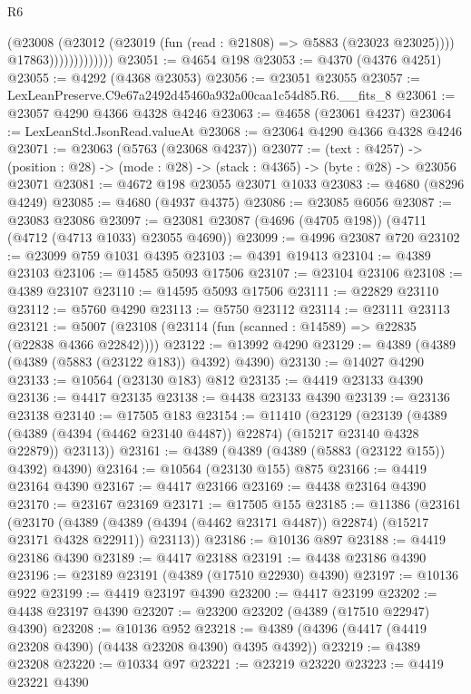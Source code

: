 \begin{lexlean}{R6}
\begin{coremodule}
                            (@23008
                              (@23012 (@23019 (fun (read : @21808) => @5883 (@23023 @23025))))
                              @17863)))))))))))))
@23051 := @4654 @198
@23053 := @4370 (@4376 @4251)
@23055 := @4292 (@4368 @23053)
@23056 := @23051 @23055
@23057 := LexLeanPreserve.C9e67a2492d45460a932a00caa1c54d85.R6.__fits_8
@23061 := @23057 @4290 @4366 @4328 @4246
@23063 := @4658 (@23061 @4237)
@23064 := LexLeanStd.JsonRead.valueAt
@23068 := @23064 @4290 @4366 @4328 @4246
@23071 := @23063 (@5763 (@23068 @4237))
@23077 := (text : @4257) ->
  (position : @28) -> (mode : @28) -> (stack : @4365) -> (byte : @28) -> @23056 @23071
@23081 := @4672 @198 @23055 @23071 @1033
@23083 := @4680 (@8296 @4249)
@23085 := @4680 (@4937 @4375)
@23086 := @23085 @6056
@23087 := @23083 @23086
@23097 := @23081 @23087 (@4696 (@4705 @198)) (@4711 (@4712 (@4713 @1033) @23055 @4690))
@23099 := @4996 @23087 @720
@23102 := @23099 @759 @1031 @4395
@23103 := @4391 @19413
@23104 := @4389 @23103
@23106 := @14585 @5093 @17506
@23107 := @23104 @23106
@23108 := @4389 @23107
@23110 := @14595 @5093 @17506
@23111 := @22829 @23110
@23112 := @5760 @4290
@23113 := @5750 @23112
@23114 := @23111 @23113
@23121 := @5007 (@23108 (@23114 (fun (scanned : @14589) => @22835 (@22838 @4366 @22842))))
@23122 := @13992 @4290
@23129 := @4389 (@4389 (@4389 (@5883 (@23122 @183)) @4392) @4390)
@23130 := @14027 @4290
@23133 := @10564 (@23130 @183) @812
@23135 := @4419 @23133 @4390
@23136 := @4417 @23135
@23138 := @4438 @23133 @4390
@23139 := @23136 @23138
@23140 := @17505 @183
@23154 := @11410
    (@23129
      (@23139
        (@4389 (@4389 (@4394 (@4462 @23140 @4487)) @22874) (@15217 @23140 @4328 @22879))
        @23113))
@23161 := @4389 (@4389 (@4389 (@5883 (@23122 @155)) @4392) @4390)
@23164 := @10564 (@23130 @155) @875
@23166 := @4419 @23164 @4390
@23167 := @4417 @23166
@23169 := @4438 @23164 @4390
@23170 := @23167 @23169
@23171 := @17505 @155
@23185 := @11386
    (@23161
      (@23170
        (@4389 (@4389 (@4394 (@4462 @23171 @4487)) @22874) (@15217 @23171 @4328 @22911))
        @23113))
@23186 := @10136 @897
@23188 := @4419 @23186 @4390
@23189 := @4417 @23188
@23191 := @4438 @23186 @4390
@23196 := @23189 @23191 (@4389 (@17510 @22930) @4390)
@23197 := @10136 @922
@23199 := @4419 @23197 @4390
@23200 := @4417 @23199
@23202 := @4438 @23197 @4390
@23207 := @23200 @23202 (@4389 (@17510 @22947) @4390)
@23208 := @10136 @952
@23218 := @4389 (@4396 (@4417 (@4419 @23208 @4390) (@4438 @23208 @4390) @4395 @4392))
@23219 := @4389 @23208
@23220 := @10334 @97
@23221 := @23219 @23220
@23223 := @4419 @23221 @4390

\end{coremodule}
\end{lexlean}
